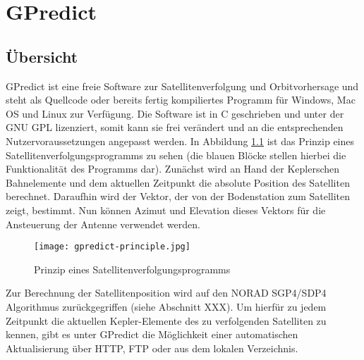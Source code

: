 
\chapter{GPredict}

\section{Übersicht}

GPredict ist eine freie Software zur Satellitenverfolgung und Orbitvorhersage und steht als Quellcode oder bereits fertig kompiliertes Programm für Windows, Mac OS und Linux zur Verfügung. Die Software ist in C geschrieben und unter der GNU \ac{GPL} lizenziert, somit kann sie frei verändert und an die entsprechenden Nutzervoraussetzungen angepasst werden.\newpar
In Abbildung \ref{fig:gpredict-principle} ist das Prinzip eines Satellitenverfolgungsprogramms zu sehen (die blauen Blöcke stellen hierbei die Funktionalität des Programms dar). Zunächst wird an Hand der Keplerschen Bahnelemente und dem aktuellen Zeitpunkt die absolute Position des Satelliten berechnet. Daraufhin wird der Vektor, der von der Bodenstation zum Satelliten zeigt, bestimmt. Nun können Azimut und Elevation dieses Vektors für die Ansteuerung der Antenne verwendet werden.

\begin{figure}[h]
	\centering
	\texttt{[image: gpredict-principle.jpg]}
	\caption{Prinzip eines Satellitenverfolgungsprogramms \cite{gpredictmanual}}
	\label{fig:gpredict-principle} 
\end{figure}

Zur Berechnung der Satellitenposition wird auf den NORAD SGP4/SDP4 Algorithmus zurückgegriffen (siehe Abschnitt XXX). Um hierfür zu jedem Zeitpunkt die aktuellen Kepler-Elemente des zu verfolgenden Satelliten zu kennen, gibt es unter GPredict die Möglichkeit einer automatischen Aktualisierung über HTTP, FTP oder aus dem lokalen Verzeichnis.

